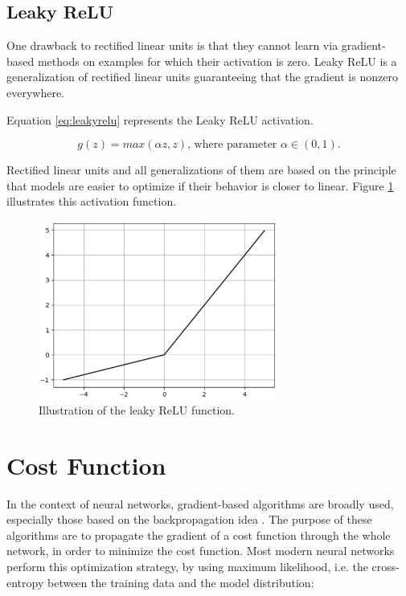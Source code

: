 \subsection{Leaky ReLU}

One drawback to rectified linear units is that they cannot learn via gradient-based methods on examples for which their activation is zero. Leaky ReLU \cite{leakyrelu} is a
generalization of rectified linear units guaranteeing that the gradient is nonzero everywhere.

Equation \ref{eq:leakyrelu} represents the Leaky ReLU activation.


\begin{equation}
g(z) = max(\alpha z,z) 
\text{, where parameter } \alpha \in (0,1).
\label{eq:leakyrelu}
\end{equation}

Rectified linear units and all generalizations of them are based on the
principle that models are easier to optimize if their behavior is closer to linear. Figure \ref{fig:leakyrelu} illustrates this activation function.


\begin{figure}[!htbp]
	\centering
	\includegraphics[width=0.7\textwidth]{Cap3/leakyrelu.eps}
	\caption{Illustration of the leaky ReLU function.}
	\label{fig:leakyrelu}
\end{figure}


\section{Cost Function}

In the context of neural networks, gradient-based algorithms are broadly used, especially those based on the backpropagation idea \cite{hinton88}. The purpose of these algorithms are to propagate the gradient of a cost function through the whole network, in order to minimize the cost function. Most modern neural networks perform this optimization strategy, by using maximum likelihood, i.e. the cross-entropy between the training data and the model distribution:

